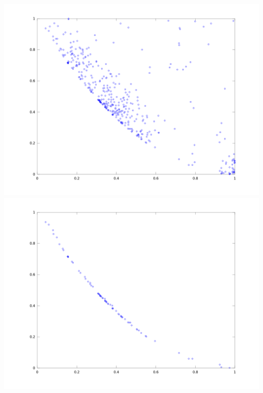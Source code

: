 \documentclass{article}
\begin{document}
\includegraphics[scale=.1]{inc_points.png}
\includegraphics[scale=.1]{inc_pareto.png}
\end{document}
